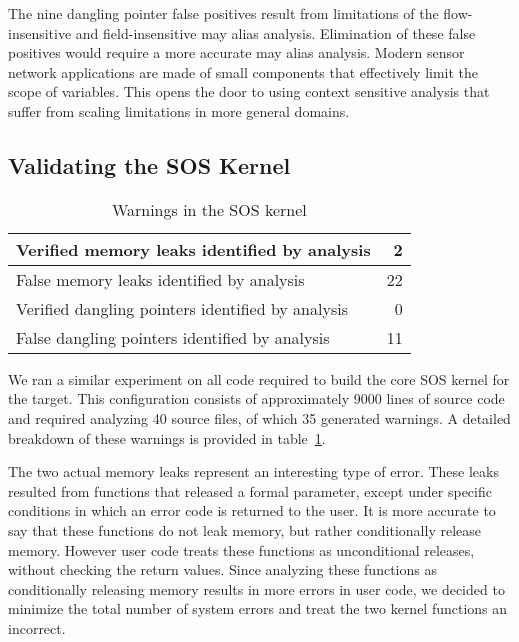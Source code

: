 \smallskip{}

The nine dangling pointer false positives result from limitations of
the flow-insensitive and field-insensitive may alias analysis.  Elimination
of these false positives would require a more accurate may alias analysis.
Modern sensor network applications are made of small components that
effectively limit the scope of variables.  This opens the door to using
context sensitive analysis that suffer from scaling limitations in
more general domains.


\subsection{Validating the SOS Kernel}

\begin{table}
\caption{Warnings in the SOS kernel}
%
\label{tab:kernel}
\centering 
\begin{tabular}{| l | r |}
    \hline 
    Verified memory leaks identified by analysis & 2 \\
    \hline
    False memory leaks identified by analysis & 22 \\
    \hline 
    Verified dangling pointers identified by analysis & 0 \\
    \hline 
    False dangling pointers identified by analysis & 11 \\
    \hline 
\end{tabular} 
%
\end{table}


We ran a similar experiment on all code required to build the core 
SOS kernel for the  target.  This configuration consists
of approximately 9000 lines of source code and required analyzing 40
source files, of which 35 generated warnings.  A detailed breakdown of
these warnings is provided in table~\ref{tab:kernel}.

The two actual memory leaks represent an interesting type of error.
These leaks resulted from functions that released a formal parameter,
except 
%
%
under specific conditions in which 
%
an error code is returned to the user.
%
It is more accurate to say that these functions do not leak
memory, but rather conditionally release memory.  However user code
treats these functions as unconditional releases, without checking
the return values.  Since analyzing these functions as conditionally 
releasing memory 
results in more errors in user code,
we decided to minimize the total number of system errors and 
treat the two kernel functions an incorrect.

